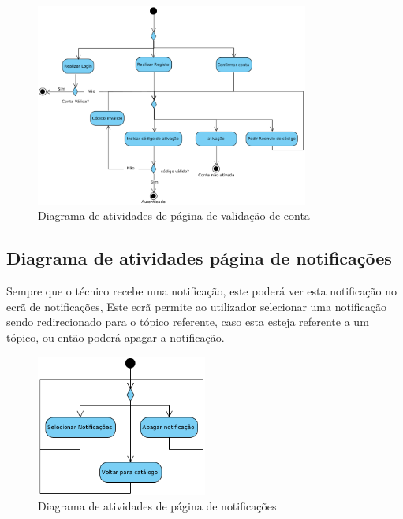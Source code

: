 \begin{figure}[htb]
    \centering
    \includegraphics[width=0.8\textwidth]{images/diagramas/atividades/diagrama_atividades_autenticação.png}
    \caption{Diagrama de atividades de página de validação de conta}
    \label{fig:26}
\end{figure}

\newpage

\subsection{Diagrama de atividades página de notificações}

Sempre que o técnico recebe uma notificação, este poderá ver esta notificação no ecrã de notificações, 
Este ecrã permite ao utilizador selecionar uma notificação sendo redirecionado para o tópico referente,
caso esta esteja referente a um tópico, ou então poderá apagar a notificação.

\begin{figure}[htb]
    \centering
    \includegraphics[width=0.5\textwidth]{images/diagramas/atividades/diagrama_atividades_noti.png}
    \caption{Diagrama de atividades de página de notificações}
    \label{fig:27}
\end{figure}

